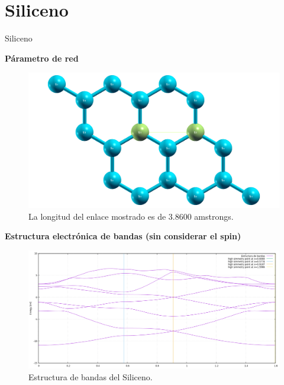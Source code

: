\section{Siliceno}


\begin{frame}{Siliceno}

    \textbf{Párametro de red}

    \begin{figure}[H]
        \centering
        \includegraphics[scale=0.2]{images_siliceno/longitud_enlace_3_8600_amstrongs.png}
        \caption{La longitud del enlace mostrado es de 3.8600 amstrongs.}
    \end{figure}
\end{frame}


\begin{frame}

    \textbf{Estructura electrónica de bandas (sin considerar el spin)}

    \begin{figure}[H]
        \centering
        \includegraphics[scale=0.34]{images_siliceno/bands_structure.png}
        \caption{Estructura de bandas del Siliceno.}
    \end{figure}
\end{frame}

